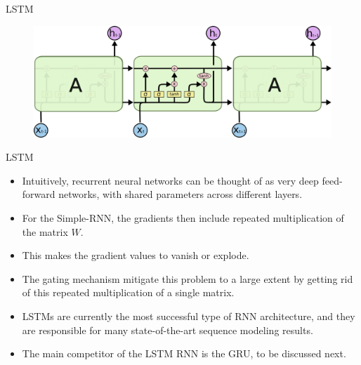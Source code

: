 \documentclass[handout]{beamer}
\begin{document}
\begin{frame}{LSTM}
  \begin{figure}[h]
        	\includegraphics[scale = 0.35]{pics/LSTMchain.png}
        \end{figure}
\end{frame}


\begin{frame}{LSTM}
\begin{scriptsize}

\begin{itemize}
\item Intuitively, recurrent neural networks can be thought of as very deep feed-forward networks, with shared parameters across different layers.
\item For the Simple-RNN, the gradients then include repeated multiplication of the matrix $W$.
\item This makes the gradient values to vanish or explode.
\item The gating mechanism mitigate this problem to a large extent by getting rid of this repeated multiplication of a single matrix.
\item LSTMs are currently the most successful type of RNN architecture, and they are responsible for many state-of-the-art sequence modeling results.
\item The main competitor of the LSTM RNN is the GRU, to be discussed next.
\end{itemize}
\end{scriptsize}
\end{frame}
\end{document}
